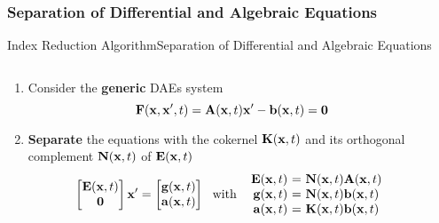 \subsubsection{Separation of Differential and Algebraic Equations}

\begin{frame}{Index Reduction Algorithm}{Separation of Differential and Algebraic Equations}
  \vspace{-1.0em}
  \begin{columns}
    \begin{column}[c]{0.6\textwidth}
      \begin{enumerate}[<+->]
        \item Consider the \textbf{generic} \acsp{DAE} system
        \begin{equation*}
          \mathbf{F}(\mathbf{x}, \mathbf{x}^\prime, t) = \mathbf{A}(\mathbf{x}, t) \mathbf{x}^\prime - \mathbf{b}(\mathbf{x}, t) = \mathbf{0}
        \end{equation*}
        \item \textbf{Separate} the equations with the cokernel $\mathbf{K}(\mathbf{x}, t)$ and its orthogonal complement $\mathbf{N}(\mathbf{x}, t)$ of $\mathbf{E}(\mathbf{x}, t)$
        \begin{equation*}
          \begin{bmatrix} \mE \\ \m{0} \end{bmatrix} \mxp = \begin{bmatrix} \mg \\ \ma \end{bmatrix}
          ~~ \text{with} ~~
          \begin{array}{r@{~}c@{~}l}
            \mE &=& \mN \mA \\
            \mg &=& \mN \mb \\
            \ma &=& \mK \mb
          \end{array}
        \end{equation*}
      \end{enumerate}
    \end{column}
    \begin{column}[c]{0.4\textwidth}
    \end{column}
  \end{columns}
\end{frame}


